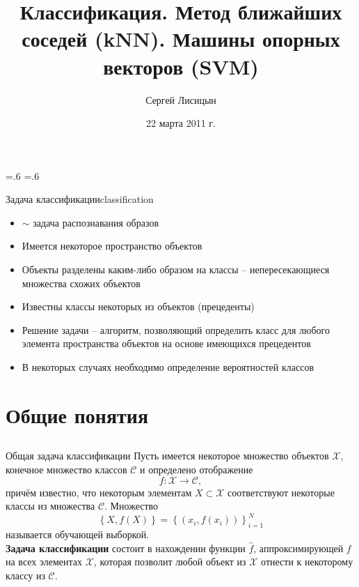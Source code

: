 \documentclass[red,unicode]{beamer}
\title[Машинное обучение]{Классификация. Метод ближайших соседей (kNN). Машины опорных векторов (SVM)}
\author{Сергей Лисицын}
\institute{lisitsyn.s.o@gmail.com}
\date{22 марта 2011 г.}
\newcommand{\bfc}{\bf\color{main!80!black}}
\begin{document}
\section{}
\abovedisplayskip=.6\abovedisplayskip
\belowdisplayskip=.6\belowdisplayskip

\begin{frame}

\titlepage
\end{frame}


\begin{frame}{Задача классификации}{classification}
\begin{itemize}
	\item $\sim$ задача распознавания образов
	\item Имеется некоторое пространство объектов
	\item Объекты разделены каким-либо образом на классы -- непересекающиеся множества схожих объектов
	\item Известны классы некоторых из объектов (прецеденты)
	\item Решение задачи -- алгоритм, позволяющий определить класс для любого элемента пространства объектов на основе имеющихся прецедентов
	\item В некоторых случаях необходимо определение вероятностей классов
\end{itemize}
\end{frame}

\section{Общие понятия}
\subsection{}
\begin{frame}{Общая задача классификации}
Пусть имеется некоторое множество объектов $\mathcal{X}$, конечное множество классов $\mathcal{C}$ и определено отображение
$$
f: \mathcal{X} \to \mathcal{C},
$$
причём известно, что некоторым элементам $X \subset \mathcal{X}$ соответствуют некоторые классы из множества $\mathcal{C}$. Множество
$$
\left \{ X, f(X) \right\} = \left\{ ( x_i, f (x_i) ) \right\}_{i=1}^{N}
$$ 
называется обучающей выборкой.\\[0.5cm]
{\bfc Задача классификации} состоит в нахождении функции $\hat f$, аппроксимирующей $f$ на всех элементах $\mathcal{X}$, которая позволит любой объект из $\mathcal{X}$ отнести к некоторому классу из $\mathcal{C}$.
\end{frame}
\end{document}
